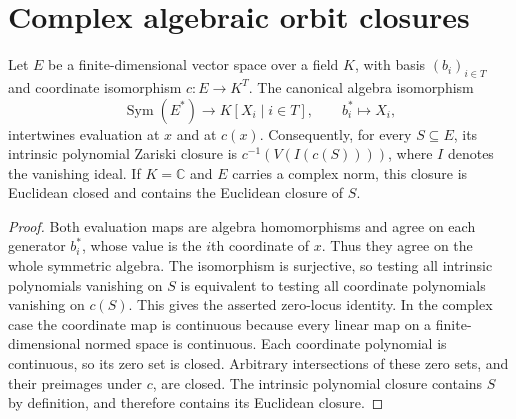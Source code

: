 \section{Complex algebraic orbit closures}

\begin{lemma}
\label{lem:complex-closure-coordinates}
\leanok
Let $E$ be a finite-dimensional vector space over a field $K$, with basis
$(b_i)_{i\in T}$ and coordinate isomorphism $c:E\to K^T$. The canonical
algebra isomorphism
\[
 \operatorname{Sym}(E^*)\longrightarrow K[X_i\mid i\in T],
 \qquad b_i^*\longmapsto X_i,
\]
intertwines evaluation at $x$ and at $c(x)$. Consequently, for every
$S\subseteq E$, its intrinsic polynomial Zariski closure is
$c^{-1}(V(I(c(S))))$, where $I$ denotes the vanishing ideal.
If $K=\mathbb C$ and $E$ carries a complex norm, this closure is
Euclidean closed and contains the Euclidean closure of $S$.
\end{lemma}
\begin{proof}
Both evaluation maps are algebra homomorphisms and agree on each generator
$b_i^*$, whose value is the $i$th coordinate of $x$. Thus they agree on
the whole symmetric algebra. The isomorphism is surjective, so testing
all intrinsic polynomials vanishing on $S$ is equivalent to testing all
coordinate polynomials vanishing on $c(S)$. This gives the asserted
zero-locus identity. In the complex case the coordinate map is continuous
because every linear map on a finite-dimensional normed space is continuous.
Each coordinate polynomial is continuous, so its zero set is closed.
Arbitrary intersections of these zero sets, and their preimages under $c$,
are closed. The intrinsic polynomial closure contains $S$ by definition,
and therefore contains its Euclidean closure.
\end{proof}

